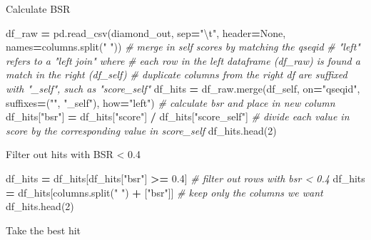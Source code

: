 \documentclass[
]{book}
\newenvironment{Shaded}{\begin{snugshade}}{\end{snugshade}}
\newcommand{\CharTok}[1]{\textcolor[rgb]{0.31,0.60,0.02}{#1}}
\newcommand{\CommentTok}[1]{\textcolor[rgb]{0.56,0.35,0.01}{\textit{#1}}}
\newcommand{\DecValTok}[1]{\textcolor[rgb]{0.00,0.00,0.81}{#1}}
\newcommand{\FloatTok}[1]{\textcolor[rgb]{0.00,0.00,0.81}{#1}}
\newcommand{\NormalTok}[1]{#1}
\newcommand{\OperatorTok}[1]{\textcolor[rgb]{0.81,0.36,0.00}{\textbf{#1}}}
\newcommand{\StringTok}[1]{\textcolor[rgb]{0.31,0.60,0.02}{#1}}
\newcommand{\VariableTok}[1]{\textcolor[rgb]{0.00,0.00,0.00}{#1}}
\begin{document}
Calculate BSR

\begin{Shaded}
\begin{Highlighting}[numbers=left,,]
\NormalTok{df\_raw }\OperatorTok{=}\NormalTok{ pd.read\_csv(diamond\_out, sep}\OperatorTok{=}\StringTok{"}\CharTok{\textbackslash{}t}\StringTok{"}\NormalTok{, header}\OperatorTok{=}\VariableTok{None}\NormalTok{, names}\OperatorTok{=}\NormalTok{columns.split(}\StringTok{" "}\NormalTok{))}
\CommentTok{\# merge in self scores by matching the qseqid}
\CommentTok{\# "left" refers to a "left join" where}
\CommentTok{\# each row in the left dataframe (df\_raw) is found a match in the right (df\_self)}
\CommentTok{\# duplicate columns from the right df are suffixed with "\_self", such as "score\_self"}
\NormalTok{df\_hits }\OperatorTok{=}\NormalTok{ df\_raw.merge(df\_self, on}\OperatorTok{=}\StringTok{"qseqid"}\NormalTok{, suffixes}\OperatorTok{=}\NormalTok{(}\StringTok{""}\NormalTok{, }\StringTok{"\_self"}\NormalTok{), how}\OperatorTok{=}\StringTok{"left"}\NormalTok{)}
\CommentTok{\# calculate bsr and place in new column}
\NormalTok{df\_hits[}\StringTok{"bsr"}\NormalTok{] }\OperatorTok{=}\NormalTok{ df\_hits[}\StringTok{"score"}\NormalTok{] }\OperatorTok{/}\NormalTok{ df\_hits[}\StringTok{"score\_self"}\NormalTok{] }\CommentTok{\# divide each value in score by the corresponding value in score\_self}
\NormalTok{df\_hits.head(}\DecValTok{2}\NormalTok{)}
\end{Highlighting}
\end{Shaded}

Filter out hits with BSR \textless{} 0.4

\begin{Shaded}
\begin{Highlighting}[numbers=left,,]
\NormalTok{df\_hits }\OperatorTok{=}\NormalTok{ df\_hits[df\_hits[}\StringTok{"bsr"}\NormalTok{] }\OperatorTok{\textgreater{}=} \FloatTok{0.4}\NormalTok{] }\CommentTok{\# filter out rows with bsr \textless{} 0.4}
\NormalTok{df\_hits }\OperatorTok{=}\NormalTok{ df\_hits[columns.split(}\StringTok{" "}\NormalTok{) }\OperatorTok{+}\NormalTok{ [}\StringTok{"bsr"}\NormalTok{]] }\CommentTok{\# keep only the columns we want}
\NormalTok{df\_hits.head(}\DecValTok{2}\NormalTok{)}
\end{Highlighting}
\end{Shaded}

Take the best hit
\end{document}
